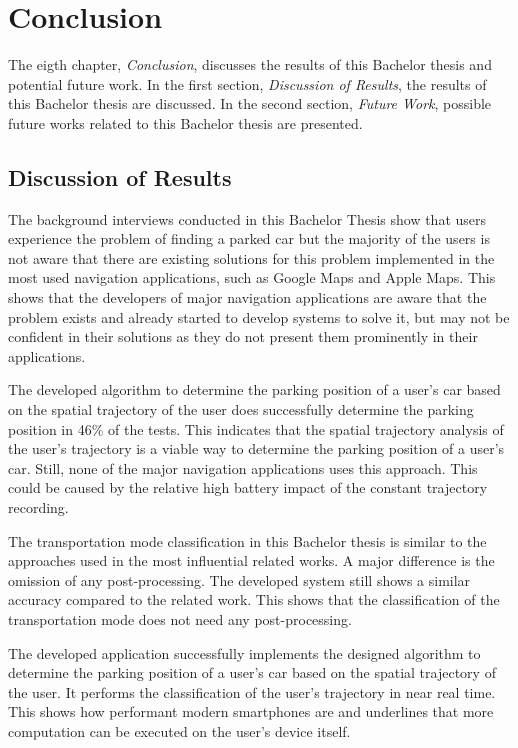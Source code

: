 \chapter{Conclusion}
The eigth chapter, \textit{Conclusion}, discusses the results of this Bachelor thesis and potential future work. In the first section, \textit{Discussion of Results}, the results of this Bachelor thesis are discussed. In the second section, \textit{Future Work}, possible future works related to this Bachelor thesis are presented. 

\section{Discussion of Results}


The background interviews conducted in this Bachelor Thesis show that users experience the problem of finding a parked car but the majority of the users is not aware that there are existing solutions for this problem implemented in the most used navigation applications, such as Google Maps and Apple Maps. This shows that the developers of major navigation applications are aware that the problem exists and already started to develop systems to solve it, but may not be confident in their solutions as they do not present them prominently in their applications.

The developed algorithm to determine the parking position of a user's car based on the spatial trajectory of the user does successfully determine the parking position in 46\% of the tests. This indicates that the spatial trajectory analysis of the user's trajectory is a viable way to determine the parking position of a user's car. Still, none of the major navigation applications uses this approach. This could be caused by the relative high battery impact of the constant trajectory recording. 

The transportation mode classification in this Bachelor thesis is similar to the approaches used in the most influential related works. A major difference is the omission of any post-processing. The developed system still shows a similar accuracy compared to the related work. This shows that the classification of the transportation mode does not need any post-processing. 

The developed application successfully implements the designed algorithm to determine the parking position of a user's car based on the spatial trajectory of the user. It performs the classification of the user's trajectory in near real time. This shows how performant modern smartphones are and underlines that more computation can be executed on the user's device itself. 


